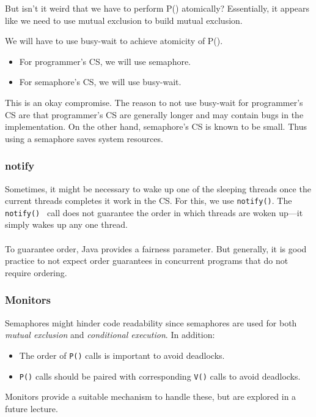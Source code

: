 \documentclass[twoside]{article}
\begin{document}
But isn't it weird that we have to perform P() atomically? Essentially, it appears like we need to use mutual exclusion to build mutual exclusion.

We will have to use busy-wait to achieve atomicity of P().

\begin{itemize}
    \item For programmer's CS, we will use semaphore.
    \item For semaphore's CS, we will use busy-wait.
\end{itemize}

This is an okay compromise. The reason to not use busy-wait for programmer's CS are that programmer's CS are generally longer and may contain bugs in the implementation. On the other hand, semaphore's CS is known to be small. Thus using a semaphore saves system resources.

\subsubsection{notify}

Sometimes, it might be necessary to wake up one of the sleeping threads once the current threads completes it work in the CS. For this, we use {\tt notify()}. The {\tt notify() } call does not guarantee the order in which threads are woken up---it simply wakes up any one thread. 
\\\\
To guarantee order, Java provides a fairness parameter. But generally, it is good practice to not expect order guarantees in concurrent programs that do not require ordering.

\subsubsection{Monitors}

Semaphores might hinder code readability since semaphores are used for both {\it mutual exclusion} and {\it conditional execution}. In addition:

\begin{itemize}
    \item The order of {\tt P()} calls is important to avoid deadlocks.
    \item {\tt P()} calls should be paired with corresponding {\tt V()} calls to avoid deadlocks.
\end{itemize}

Monitors provide a suitable mechanism to handle these, but are explored in a future lecture.
\end{document}
